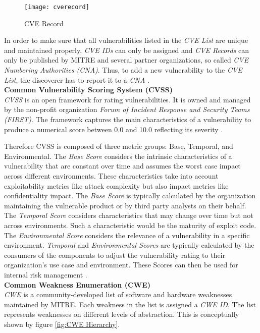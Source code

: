 \begin{figure}[H]
	\centering
	\texttt{[image: cverecord]}
	\caption[CVE Record]{CVE Record }
	\label{fig:CVE Record}
\end{figure}

In order to make sure that all vulnerabilities listed in the \textit{CVE List} are unique and maintained properly, \textit{CVE IDs} can only be assigned and \textit{CVE Records} can only be published by MITRE and several partner organizations, so called \textit{CVE Numbering Authorities (CNA)}. Thus, to add a new vulnerability to the \textit{CVE List}, the discoverer has to report it to a \emph{CNA} \cite{CVEWebsite}.\\

\noindent
\textbf{Common Vulnerability Scoring System (CVSS)}\\
\noindent
\emph{CVSS} is an open framework for rating vulnerabilities. It is owned and managed by the non-profit organization \textit{Forum of Incident Response and Security Teams (FIRST)}. The framework captures the main characteristics of a vulnerability to produce a numerical score between 0.0 and 10.0 reflecting its severity \cite{CVSSSpec}.\par
Therefore CVSS is composed of three metric groups: Base, Temporal, and Environmental. The \textit{Base Score} considers the intrinsic characteristics of a vulnerability that are constant over time and assumes the worst case impact across different environments. These characteristics take into account exploitability metrics like attack complexity but also impact metrics like confidentiality impact. The \textit{Base Score} is typically calculated by the organization maintaining the vulnerable product or by third party analysts on their behalf. The \textit{Temporal Score} considers characteristics that may change over time but not across environments. Such a characteristic would be the maturity of exploit code. The \textit{Environmental Score} considers the relevance of a vulnerability in a specific environment. \textit{Temporal} and \textit{Environmental Scores} are typically calculated by the consumers of the components to adjust the vulnerability rating to their organization's use case and environment. These Scores can then be used for internal risk management \cite{CVSSSpec}.\\

\noindent
\textbf{Common Weakness Enumeration (CWE)}\\
\noindent
\emph{CWE} is a community-developed list of software and hardware weaknesses maintained by MITRE. Each weakness in the list is assigned a \textit{CWE ID}. The list represents weaknesses on different levels of abstraction. This is conceptually shown by figure \ref{fig:CWE Hierarchy}.

